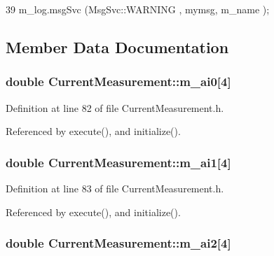 \begin{DoxyCode}
39 { m_log.msgSvc (MsgSvc::WARNING , mymsg, m_name ); }
\end{DoxyCode}


\subsection{Member Data Documentation}
\hypertarget{classCurrentMeasurement_a793b1467b6a5388361340d41f9e8833f}{
\subsubsection[{m\_\-ai0}]{\setlength{\rightskip}{0pt plus 5cm}double {\bf CurrentMeasurement::m\_\-ai0}\mbox{[}4\mbox{]}}}
\label{classCurrentMeasurement_a793b1467b6a5388361340d41f9e8833f}


Definition at line 82 of file CurrentMeasurement.h.

Referenced by execute(), and initialize().\hypertarget{classCurrentMeasurement_aeef18708be94b89de9c4384dd452207d}{
\subsubsection[{m\_\-ai1}]{\setlength{\rightskip}{0pt plus 5cm}double {\bf CurrentMeasurement::m\_\-ai1}\mbox{[}4\mbox{]}}}
\label{classCurrentMeasurement_aeef18708be94b89de9c4384dd452207d}


Definition at line 83 of file CurrentMeasurement.h.

Referenced by execute(), and initialize().\hypertarget{classCurrentMeasurement_a27ce0cfd8d1c04f6cd4d8de0403fafba}{
\subsubsection[{m\_\-ai2}]{\setlength{\rightskip}{0pt plus 5cm}double {\bf CurrentMeasurement::m\_\-ai2}\mbox{[}4\mbox{]}}}
\label{classCurrentMeasurement_a27ce0cfd8d1c04f6cd4d8de0403fafba}


